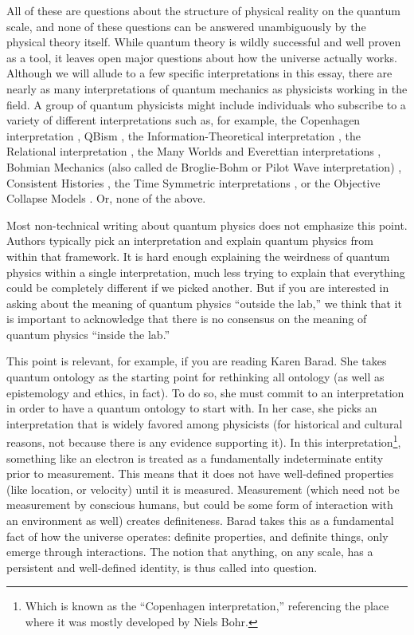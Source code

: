 \documentclass[12pt,onecolumn,preprintnumbers,amsmath,amssymbn,reprint,nofootinbib,superscriptaddress]{revtex4}    %
\begin{document}
All of these are questions about the structure of physical reality on the quantum scale, and none of these questions can be answered unambiguously by the physical theory itself.  While quantum theory is wildly successful and well proven as a tool, it leaves open major questions about how the universe actually works. Although we will allude to a few specific interpretations in this essay, there are nearly as many interpretations of quantum mechanics as physicists working in the field.  
A group of quantum physicists might include individuals who subscribe to a variety of different interpretations \cite{interpretations} such as, for example, the Copenhagen interpretation \cite{copenhagen}, QBism \cite{qbism}, the Information-Theoretical interpretation  \cite{information,Bub}, the Relational interpretation \cite{Bitbol, Rovelli}, the Many Worlds and Everettian interpretations \cite{manyworlds}, Bohmian Mechanics (also called de Broglie-Bohm or Pilot Wave interpretation) \cite{bohm}, Consistent Histories \cite{histories}, the Time Symmetric interpretations \cite{retrocausal, aharonov,Wharton07}, or the Objective Collapse Models \cite{collapse}.  Or, none of the above.

Most non-technical writing about quantum physics does not emphasize this point.  Authors typically pick an interpretation and explain quantum physics from within that framework. It is hard enough explaining the weirdness of quantum physics within a single interpretation, much less trying to explain that everything could be completely different if we picked another.  But if you are interested in asking about the meaning of quantum physics ``outside the lab,'' we think that it is important to acknowledge that there is no consensus on the meaning of quantum physics ``inside the lab.''  

This point is relevant, for example, if you are reading Karen Barad. She takes quantum ontology as the starting point for rethinking all ontology (as well as epistemology and ethics, in fact). To do so, she must commit to an interpretation in order to have a quantum ontology to start with.  In her case, she picks an interpretation that is widely favored among physicists (for historical and cultural reasons, not because there is any evidence supporting it).  In this interpretation\footnote{Which is known as the ``Copenhagen interpretation,'' referencing the place where it was mostly developed by Niels Bohr.}, something like an electron is treated as a fundamentally indeterminate entity prior to measurement.  This means that it does not have well-defined properties (like location, or velocity) until it is measured.  Measurement (which need not be measurement by conscious humans, but could be some form of interaction with an environment as well) creates definiteness.  Barad takes this as a fundamental fact of how the universe operates:  definite properties, and definite things, only emerge through interactions.  The notion that anything, on any scale, has a persistent and well-defined identity, is thus called into question.  
\end{document}
